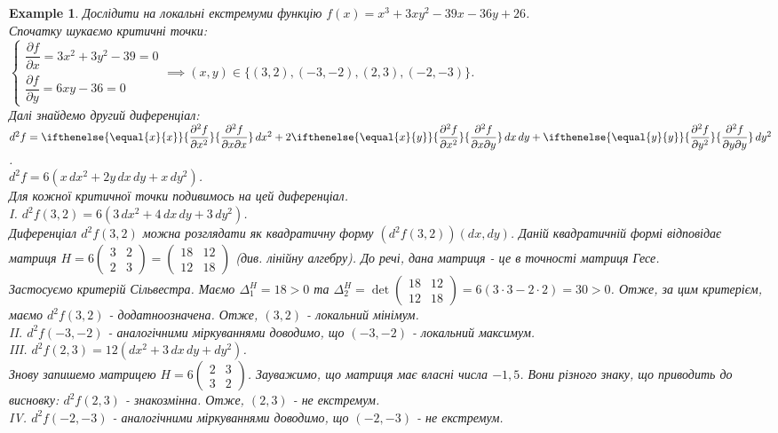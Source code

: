 \documentclass[a4paper, 10pt]{article}
\def\departial#1#2{\dfrac{\partial {#1}}{\partial {#2}}}
\def\seconddepartial#1#2#3{\ifthenelse{\equal{#2}{#3}}{\dfrac{\partial^2 {#1}}{\partial {#2}^2}}{\dfrac{\partial^2 {#1}}{\partial {#2} \partial {#3}}}}
\theoremstyle{theoremdd}
\theoremstyle{theoremdd}
\theoremstyle{theoremdd}
\theoremstyle{theoremdd}
\theoremstyle{theoremdd}
\newtheorem{example}[theorem]{Example}
\theoremstyle{theoremdd}
\theoremstyle{theoremdd}
\theoremstyle{theoremdd}
\theoremstyle{theoremdd}
\begin{document}
\begin{example}
Дослідити на локальні екстремуми функцію $f(x) = x^3+3xy^2-39x-36y+26$.\\
Спочатку шукаємо критичні точки:\\
$\begin{cases} \departial{f}{x} = 3x^2+3y^2-39 = 0 \\ \departial{f}{y} = 6xy-36 = 0 \end{cases} \implies (x,y) \in \{ (3,2), (-3,-2), (2,3), (-2,-3) \}$.\\
Далі знайдемо другий диференціал:\\
$d^2 f = \seconddepartial{f}{x}{x}\,dx^2 + 2\seconddepartial{f}{x}{y}\,dx\,dy + \seconddepartial{f}{y}{y}\,dy^2$.\\
$d^2 f = 6 (x \,dx^2 + 2y\,dx\,dy + x\,dy^2)$.\\
Для кожної критичної точки подивимось на цей диференціал.\\
I. $d^2 f(3,2) = 6(3\,dx^2 + 4\,dx\,dy + 3\,dy^2)$.\\
Диференціал $d^2 f(3,2)$ можна розглядати як квадратичну форму $(d^2 f(3,2))(dx,dy)$. Даній квадратичній формі відповідає матриця $H = 6\begin{pmatrix} 3 & 2 \\ 2 & 3 \end{pmatrix} = \begin{pmatrix}
18 & 12 \\
12 & 18
\end{pmatrix}$ (див. лінійну алгебру). До речі, дана матриця - це в точності матриця Гесе.\\
Застосуємо критерій Сільвестра. Маємо $\Delta^H_1 = 18 > 0$ та $\Delta^H_2 = \det \begin{pmatrix}
18 & 12 \\
12 & 18
\end{pmatrix} = 6 (3 \cdot 3 - 2 \cdot 2) = 30 > 0$. Отже, за цим критерієм, маємо $d^2f(3,2)$ - додатноозначена. Отже, $(3,2)$ - локальний мінімум.
\bigskip \\
II. $d^2f(-3,-2)$ - аналогічними міркуваннями доводимо, що $(-3,-2)$ - локальний максимум.
\bigskip \\
III. $d^2f(2,3) = 12(dx^2 + 3\,dx\,dy + dy^2)$.\\
Знову запишемо матрицею $H = 6\begin{pmatrix}
2 & 3 \\
3 & 2
\end{pmatrix}$. Зауважимо, що матриця має власні числа $-1,5$. Вони різного знаку, що приводить до висновку: $d^2f(2,3)$ - знакозмінна. Отже, $(2,3)$ - не екстремум.
\bigskip \\
IV. $d^2f(-2,-3)$ - аналогічними міркуваннями доводимо, що $(-2,-3)$ - не екстремум.
\end{example}
\end{document}
